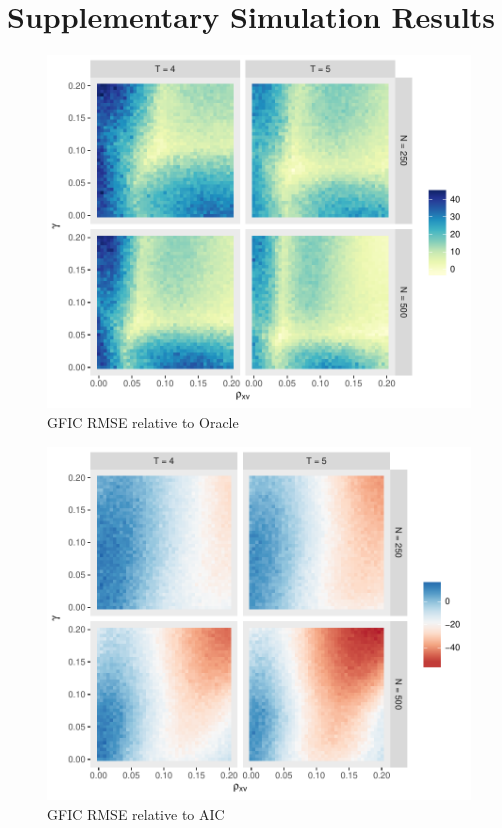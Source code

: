 \section{Supplementary Simulation Results}
\label{sec:simulation_supplement}
\begin{figure}
\centering
\includegraphics[scale = 0.8]{./simulations/DynamicPanel/results/Dpanel_GFIC_RMSE_rel_oracle}
\caption{GFIC RMSE relative to Oracle}
\end{figure}
\begin{figure}
\centering
\includegraphics[scale = 0.8]{./simulations/DynamicPanel/results/Dpanel_GFIC_RMSE_rel_AIC}
\caption{GFIC RMSE relative to AIC}
\end{figure}
